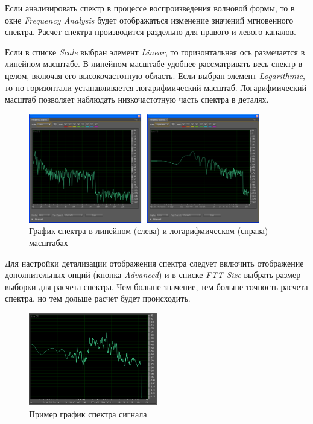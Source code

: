 \documentclass[oneside, final, 14pt]{extreport}
\begin{document}
Если анализировать спектр в процессе воспроизведения волновой формы, то в окне \textit{Frequency Analysis} будет отображаться изменение значений мгновенного спектра. Расчет спектра производится раздельно для правого и левого каналов. 

Если в списке \textit{Scale} выбран элемент \textit{Linear}, то горизонтальная ось размечается в линейном масштабе. В линейном масштабе удобнее рассматривать весь спектр в целом, включая его высокочастотную область. Если выбран элемент \textit{Logarithmic}, то по горизонтали устанавливается логарифмический масштаб. Логарифмический масштаб позволяет наблюдать низкочастотную часть спектра в деталях. 

\begin{figure}[h!]
\centering
\includegraphics[width=0.90\textwidth]{pic-specter-02}
\caption{График спектра в линейном (слева) и логарифмическом (справа) масштабах}
\label{pic-specter-02}
\end{figure}

Для настройки детализации отображения спектра следует включить отображение дополнительных опций (кнопка \textit{Advanced}) и в списке \textit{FTT Size} выбрать размер выборки для расчета спектра. Чем больше значение, тем больше точность расчета спектра, но тем дольше расчет будет происходить.

\begin{figure}[h!]
\centering
\includegraphics[width=0.5\textwidth]{pic-specter-03}
\caption{Пример график спектра сигнала}
\label{pic-specter-03}
\end{figure}
\end{document}
